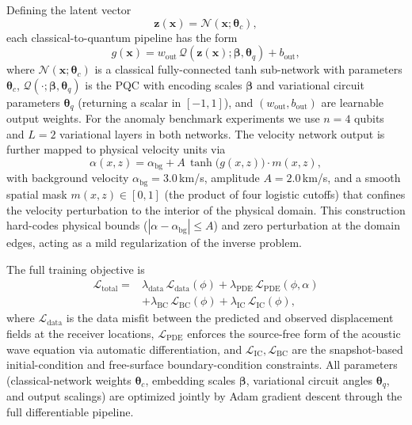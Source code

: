 Defining the latent vector
\begin{equation}
    \mathbf{z}(\mathbf{x}) = \mathcal{N}(\mathbf{x}; \boldsymbol{\theta}_c),
\end{equation}
each classical-to-quantum pipeline has the form
\begin{equation}
    g(\mathbf{x}) = w_\text{out}\, \mathcal{Q}\!\left(\mathbf{z}(\mathbf{x}); \boldsymbol{\beta}, \boldsymbol{\theta}_q\right) + b_\text{out},
\end{equation}
where $\mathcal{N}(\mathbf{x}; \boldsymbol{\theta}_c)$ is a classical fully-connected tanh sub-network with parameters $\boldsymbol{\theta}_c$, $\mathcal{Q}(\cdot; \boldsymbol{\beta}, \boldsymbol{\theta}_q)$ is the PQC with encoding scales $\boldsymbol{\beta}$ and variational circuit parameters $\boldsymbol{\theta}_q$ (returning a scalar in $[-1,1]$), and $(w_\text{out}, b_\text{out})$ are learnable output weights. For the anomaly benchmark experiments we use $n = 4$ qubits and $L = 2$ variational layers in both networks. The velocity network output is further mapped to physical velocity units via
\begin{equation}
    \alpha(x,z) = \alpha_\text{bg} + A\, \tanh\!\big(g(x,z)\big) \cdot m(x,z),
    \label{eq:ch4-velocity-output}
\end{equation}
with background velocity $\alpha_\text{bg} = 3.0$\,km/s, amplitude $A = 2.0$\,km/s, and a smooth spatial mask $m(x,z) \in [0,1]$ (the product of four logistic cutoffs) that confines the velocity perturbation to the interior of the physical domain. This construction hard-codes physical bounds ($|\alpha - \alpha_\text{bg}| \leq A$) and zero perturbation at the domain edges, acting as a mild regularization of the inverse problem.

The full training objective is
\begin{equation}
\begin{aligned}
\mathcal{L}_\text{total}
= {}& \lambda_\text{data}\,\mathcal{L}_\text{data}(\phi)
+ \lambda_\text{PDE}\,\mathcal{L}_\text{PDE}(\phi, \alpha) \\
&+ \lambda_\text{BC}\,\mathcal{L}_\text{BC}(\phi)
+ \lambda_\text{IC}\,\mathcal{L}_\text{IC}(\phi),
\end{aligned}
\end{equation}
where $\mathcal{L}_\text{data}$ is the data misfit between the predicted and observed displacement fields at the receiver locations, $\mathcal{L}_\text{PDE}$ enforces the source-free form of the acoustic wave equation  via automatic differentiation, and $\mathcal{L}_\text{IC}, \mathcal{L}_\text{BC}$ are the snapshot-based initial-condition and free-surface boundary-condition constraints. All parameters (classical-network weights $\boldsymbol{\theta}_c$, embedding scales $\boldsymbol{\beta}$, variational circuit angles $\boldsymbol{\theta}_q$, and output scalings) are optimized jointly by Adam gradient descent through the full differentiable pipeline.

